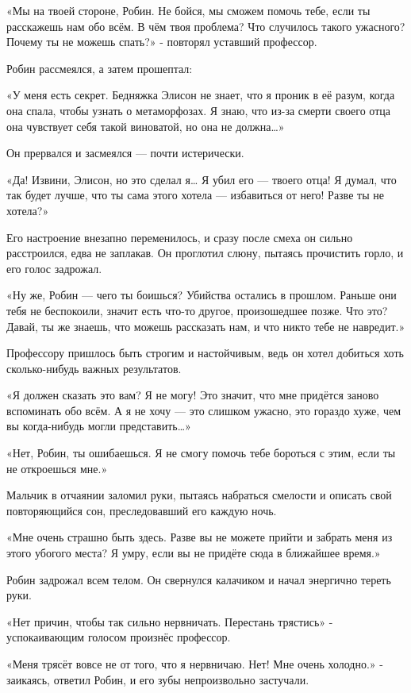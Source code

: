 \documentclass[a4paper,12pt]{book}
\begin{document}
\par
«Мы на твоей стороне, Робин. Не бойся, мы сможем помочь тебе, если ты расскажешь нам обо всём. В чём твоя проблема? Что случилось такого ужасного? Почему ты не можешь спать?» - повторял уставший профессор.
\par
Робин рассмеялся, а затем прошептал:
\par
«У меня есть секрет. Бедняжка Элисон не знает, что я проник в её разум, когда она спала, чтобы узнать о метаморфозах. Я знаю, что из-за смерти своего отца она чувствует себя такой виноватой, но она не должна…»
\par
Он прервался и засмеялся — почти истерически.
\par
«Да! Извини, Элисон, но это сделал я… Я убил его — твоего отца! Я думал, что так будет лучше, что ты сама этого хотела — избавиться от него! Разве ты не хотела?»
\par
Его настроение внезапно переменилось, и сразу после смеха он сильно расстроился, едва не заплакав. Он проглотил слюну, пытаясь прочистить горло, и его голос задрожал.
\par
«Ну же, Робин — чего ты боишься? Убийства остались в прошлом. Раньше они тебя не беспокоили, значит есть что-то другое, произошедшее позже. Что это? Давай, ты же знаешь, что можешь рассказать нам, и что никто тебе не навредит.»
\par
Профессору пришлось быть строгим и настойчивым, ведь он хотел добиться хоть сколько-нибудь важных результатов.
\par
«Я должен сказать это вам? Я не могу! Это значит, что мне придётся заново вспоминать обо всём. А я не хочу — это слишком ужасно, это гораздо хуже, чем вы когда-нибудь могли представить…»
\par
«Нет, Робин, ты ошибаешься. Я не смогу помочь тебе бороться с этим, если ты не откроешься мне.»
\par
Мальчик в отчаянии заломил руки, пытаясь набраться смелости и описать свой повторяющийся сон, преследовавший его каждую ночь.
\par
«Мне очень страшно быть здесь. Разве вы не можете прийти и забрать меня из этого убогого места? Я умру, если вы не придёте сюда в ближайшее время.»
\par
Робин задрожал всем телом. Он свернулся калачиком и начал энергично тереть руки.
\par
«Нет причин, чтобы так сильно нервничать. Перестань трястись» - успокаивающим голосом произнёс профессор.
\par
«Меня трясёт вовсе не от того, что я нервничаю. Нет! Мне очень холодно.» - заикаясь, ответил Робин, и его зубы непроизвольно застучали.
\end{document}
